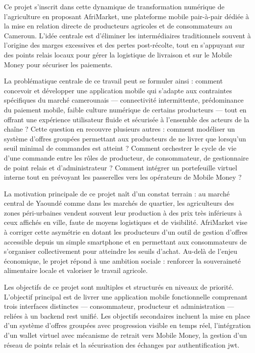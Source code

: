 \documentclass[12pt, a4paper, oneside]{report}
\begin{document}
Ce projet s'inscrit dans cette dynamique de transformation numérique de l'agriculture en
proposant AfriMarket, une plateforme mobile pair-à-pair dédiée à la mise en relation
directe de producteurs agricoles et de consommateurs au Cameroun. L'idée centrale est
d'éliminer les intermédiaires traditionnels souvent à l'origine des marges excessives et
des pertes post-récolte, tout en s'appuyant sur des points relais locaux pour gérer la
logistique de livraison et sur le Mobile Money pour sécuriser les paiements.

La problématique centrale de ce travail peut se formuler ainsi : comment concevoir et
développer une application mobile qui s'adapte aux contraintes spécifiques du marché
camerounais — connectivité intermittente, prédominance du paiement mobile, faible culture
numérique de certains producteurs — tout en offrant une expérience utilisateur fluide et
sécurisée à l'ensemble des acteurs de la chaîne ? Cette question en recouvre plusieurs
autres : comment modéliser un système d'offres groupées permettant aux producteurs de ne
livrer que lorsqu'un seuil minimal de commandes est atteint ? Comment orchestrer le cycle
de vie d'une commande entre les rôles de producteur, de consommateur, de gestionnaire de
point relais et d'administrateur ? Comment intégrer un portefeuille virtuel interne tout
en prévoyant les passerelles vers les opérateurs de Mobile Money ?

La motivation principale de ce projet naît d'un constat terrain : au marché central de
Yaoundé comme dans les marchés de quartier, les agriculteurs des zones péri-urbaines
vendent souvent leur production à des prix très inférieurs à ceux affichés en ville, faute
de moyens logistiques et de visibilité. AfriMarket vise à corriger cette asymétrie en
dotant les producteurs d'un outil de gestion d'offres accessible depuis un simple
smartphone et en permettant aux consommateurs de s'organiser collectivement pour atteindre
les seuils d'achat. Au-delà de l'enjeu économique, le projet répond à une ambition sociale :
renforcer la souveraineté alimentaire locale et valoriser le travail agricole.

Les objectifs de ce projet sont multiples et structurés en niveaux de priorité.
L'objectif principal est de livrer une application mobile fonctionnelle comprenant trois
interfaces distinctes — consommateur, producteur et administration — reliées à un backend
\gls{rest} unifié. Les objectifs secondaires incluent la mise en place d'un système
d'offres groupées avec progression visible en temps réel, l'intégration d'un wallet
virtuel avec mécanisme de retrait vers Mobile Money, la gestion d'un réseau de points
relais et la sécurisation des échanges par authentification \gls{jwt}.
\end{document}
